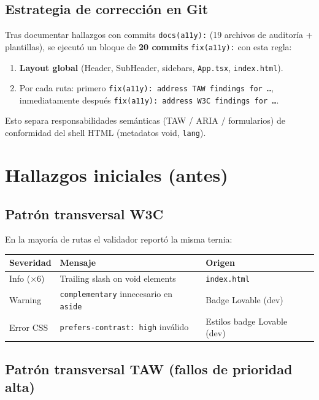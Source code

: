 \documentclass[11pt,a4paper]{article}
\begin{document}
\subsection{Estrategia de corrección en Git}

Tras documentar hallazgos con commits \texttt{docs(a11y):} (19 archivos de auditoría + plantillas), se ejecutó un bloque de \textbf{20 commits} \texttt{fix(a11y):} con esta regla:

\begin{enumerate}[noitemsep]
  \item \textbf{Layout global} (Header, SubHeader, sidebars, \texttt{App.tsx}, \texttt{index.html}).
  \item Por cada ruta: primero \texttt{fix(a11y): address TAW findings for …}, inmediatamente después \texttt{fix(a11y): address W3C findings for …}.
\end{enumerate}

Esto separa responsabilidades semánticas (TAW / ARIA / formularios) de conformidad del shell HTML (metadatos void, \texttt{lang}).

\section{Hallazgos iniciales (antes)}

\subsection{Patrón transversal W3C}

En la mayoría de rutas el validador reportó la misma ternia:
\begin{center}
\small
\begin{tabular}{@{}lll@{}}
\toprule
\textbf{Severidad} & \textbf{Mensaje} & \textbf{Origen} \\
\midrule
Info (×6) & Trailing slash on void elements & \texttt{index.html} \\
Warning & \texttt{complementary} innecesario en \texttt{aside} & Badge Lovable (dev) \\
Error CSS & \texttt{prefers-contrast: high} inválido & Estilos badge Lovable (dev) \\
\bottomrule
\end{tabular}
\end{center}

\subsection{Patrón transversal TAW (fallos de prioridad alta)}
\end{document}
